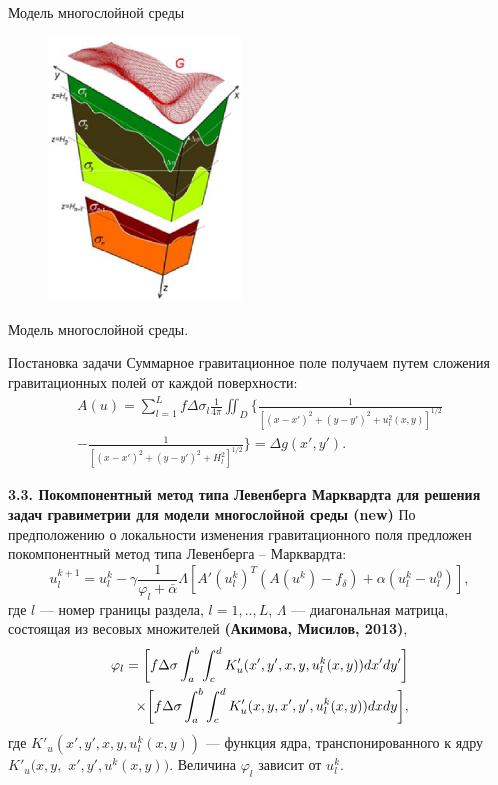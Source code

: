 \documentclass[10pt,pdf, mathserif, hyperref={unicode}]{beamer}
\begin{document}
\begin{frame}{Модель многослойной среды}
	\begin{figure}[h]
		\centering
		\includegraphics[height=7.0cm]{MultilayerModel}
		\label{fig:multlayer}
	\end{figure}
	\centering
	Модель многослойной среды.
\end{frame}
\begin{frame}{Постановка задачи}
	Суммарное гравитационное поле получаем путем сложения гравитационных полей от каждой поверхности:
	\begin{equation}\label{equ_grav}
	\begin{aligned}
	A(u)=\sum_{l=1}^{L}f\Delta\sigma_l\frac{1}{4\pi}\iint_D\bigg\{\frac{1}{[(x-x')^2+(y-y')^2+u_l^2(x,y)]^{1/2}} \\
	-\frac{1}{[(x-x')^2+(y-y')^2+H_l^2]^{1/2}}\bigg\}=\Delta g(x',y').
	\end{aligned}
	\end{equation}
\end{frame}
\begin{frame}{\small\textbf{3.3. Покомпонентный метод типа Левенберга Марквардта для решения задач гравиметрии для модели многослойной среды \textbf{(new)}}}
	По предположению о локальности изменения гравитационного поля предложен покомпонентный метод типа Левенберга -- Марквардта:
	\begin{equation}\label{comp_lm_meth}
	u_l^{k+1}=u_l^k-\gamma\frac{1}{\varphi_l+\bar{\alpha}}\Lambda[ A'(u_l^k)^T(A(u^k)-f_\delta)+\alpha (u_l^k-u_l^0)],
	\end{equation}
	где $l$ --- номер границы раздела, $l=1,..,L$, $\Lambda$ --- диагональная матрица, состоящая из весовых множителей \textbf{\color{red}(Акимова, Мисилов, 2013)}, 
	\begin{equation*}
	\begin{aligned}
	\varphi_l=\bigg[ f\Delta\sigma\int_{a}^{b}\int_{c}^{d}
	K'_u(x',y', x, y, u_l^k(x,y))dx'dy'\bigg] \notag \\ \times\bigg[f\Delta\sigma\int_{a}^{b}\int_{c}^{d}K'_u(x,y, x',y',u_l^k(x,y))dxdy\bigg], 
	\end{aligned}
	\end{equation*} 
	где $K'_u(x',y', x, y, u_l^k(x,y))$ --- функция ядра, транспонированного к ядру $K'_u(x,y,$ $ x',y',u^k(x,y))$. Величина $\varphi_l$ зависит от $u_l^k$.

\end{frame}
\end{document}
